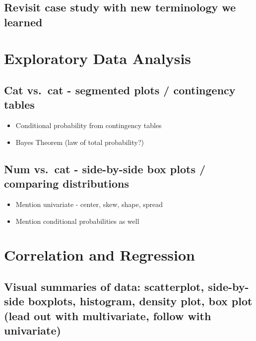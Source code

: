 \documentclass[]{book}
\providecommand{\tightlist}{%
  \setlength{\itemsep}{0pt}\setlength{\parskip}{0pt}}
\begin{document}
\hypertarget{revisit-case-study-with-new-terminology-we-learned}{%
\section{Revisit case study with new terminology we learned}\label{revisit-case-study-with-new-terminology-we-learned}}

\hypertarget{eda}{%
\chapter{Exploratory Data Analysis}\label{eda}}

\hypertarget{cat-vs.cat---segmented-plots-contingency-tables}{%
\section{Cat vs.~cat - segmented plots / contingency tables}\label{cat-vs.cat---segmented-plots-contingency-tables}}

\begin{itemize}
\tightlist
\item
  Conditional probability from contingency tables
\item
  Bayes Theorem (law of total probability?)
\end{itemize}

\hypertarget{num-vs.cat---side-by-side-box-plots-comparing-distributions}{%
\section{Num vs.~cat - side-by-side box plots / comparing distributions}\label{num-vs.cat---side-by-side-box-plots-comparing-distributions}}

\begin{itemize}
\tightlist
\item
  Mention univariate - center, skew, shape, spread
\item
  Mention conditional probabilities as well
\end{itemize}

\hypertarget{cor-reg}{%
\chapter{Correlation and Regression}\label{cor-reg}}

\hypertarget{visual-summaries-of-data-scatterplot-side-by-side-boxplots-histogram-density-plot-box-plot-lead-out-with-multivariate-follow-with-univariate}{%
\section{Visual summaries of data: scatterplot, side-by-side boxplots, histogram, density plot, box plot (lead out with multivariate, follow with univariate)}\label{visual-summaries-of-data-scatterplot-side-by-side-boxplots-histogram-density-plot-box-plot-lead-out-with-multivariate-follow-with-univariate}}
\end{document}
